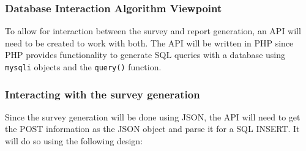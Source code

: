 \documentclass[letterpaper,10pt,serif, draftclsnofoot,onecolumn, compsoc, titlepage]{IEEEtran}
\begin{document}
\subsubsection{Database Interaction Algorithm Viewpoint}
To allow for interaction between the survey and report generation, an API will need to be created to work with both.
The API will be written in PHP since PHP provides functionality to generate SQL queries with a database using \texttt{mysqli} objects and the \texttt{query()} function.
\subsubsection{Interacting with the survey generation}
Since the survey generation will be done using JSON, the API will need to get the POST information as the JSON object and parse it for a SQL INSERT.
It will do so using the following design:
\end{document}
